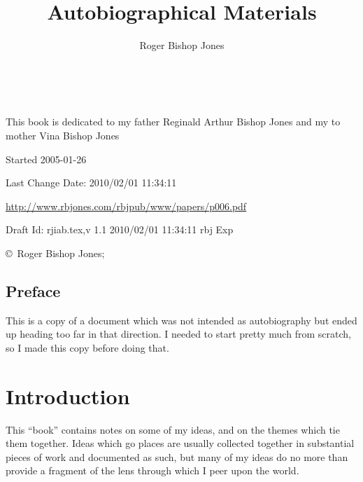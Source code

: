 \documentclass[10pt,titlepage]{book}
\title{Autobiographical Materials}
\author{Roger Bishop Jones}
\date{\ }
\begin{document}
\frontmatter

\begin{titlepage}
\maketitle

\vfill


\begin{centering}

{\parskip=0.3in
This book is dedicated to my father
\vfil
{ Reginald Arthur Bishop Jones}
\vfil
and my to mother
\vfil
{ Vina Bishop Jones}
}

\vfill

\footnotesize{
Started 2005-01-26

Last Change $ $Date: 2010/02/01 11:34:11 $ $

\href{http://www.rbjones.com/rbjpub/www/papers/p006.pdf}{http://www.rbjones.com/rbjpub/www/papers/p006.pdf}

Draft $ $Id: rjiab.tex,v 1.1 2010/02/01 11:34:11 rbj Exp $ $

\copyright\ Roger Bishop Jones;

}%
\end{centering}

\thispagestyle{empty}
\end{titlepage}

{\parskip=0pt\tableofcontents}


\mainmatter

\section*{Preface}

This is a copy of a document which was not intended as autobiography but ended up heading too far in that direction.
I needed to start pretty much from scratch, so I made this copy before doing that.

\chapter{Introduction}

This ``book'' contains notes on some of my ideas, and on the themes which tie them together.
Ideas which go places are usually collected together in substantial pieces of work and documented as such, but many of my ideas do no more than provide a fragment of the lens through which I peer upon the world.
\end{document}
